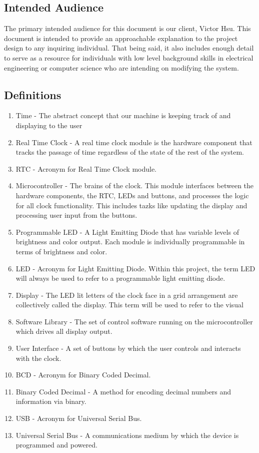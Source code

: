\documentclass[onecolumn, draftclsnofoot,10pt, compsoc]{IEEEtran}
\begin{document}
\subsection{Intended Audience}
The primary intended audience for this document is our client, Victor Hsu.
This document is intended to provide an approachable explanation to the project design to any inquiring individual.
That being said, it also includes enough detail to serve as a resource for individuals with low level background skills in electrical engineering or computer science who are intending on modifying the system.

\subsection{Definitions}
\begin{enumerate}[]
  \item Time - The abstract concept that our machine is keeping track of and displaying to the user
  \item Real Time Clock - A real time clock module is the hardware component that tracks the passage
  of time regardless of the state of the rest of the system.
  \item RTC - Acronym for Real Time Clock module.
  \item Microcontroller - The brains of the clock. This module interfaces between the hardware
  components, the RTC, LEDs and buttons, and processes the logic for all clock functionality.
  This includes tazks like updating the display and processing user input from the buttons.
  \item Programmable LED - A Light Emitting Diode that has variable levels of brightness and
  color output. Each module is individually programmable in terms of brightness and color.
  \item LED - Acronym for Light Emitting Diode. Within this project, the term LED will always
  be used to refer to a programmable light emitting diode.
  \item Display - The LED lit letters of the clock face in a grid arrangement are collectively
  called the display. This term will be used to refer to the visual
  \item Software Library - The set of control software running on the microcontroller which drives all display output.
  \item User Interface - A set of buttons by which the user controls and interacts with the clock.
  \item BCD - Acronym for Binary Coded Decimal.
  \item Binary Coded Decimal - A method for encoding decimal numbers and information via binary.
  \item USB - Acronym for Universal Serial Bus.
  \item Universal Serial Bus - A communications medium by which the device is programmed and  powered.
\end{enumerate}
\end{document}
